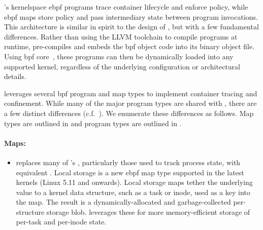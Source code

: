 \bpfcontain{}'s kernelspace \gls{ebpf} programs trace container lifecycle and enforce
policy, while \gls{ebpf} maps store policy and pass intermediary state between program
invocations. This architecture is similar in spirit to the design of \bpfbox{}, but with
a few fundamental differences. Rather than using the LLVM toolchain to compile
programs at runtime, \bpfcontain{} pre-compiles and embeds the \gls{bpf} object code into
its binary object file. Using \gls{bpf} \gls{core}~\cite{nakryiko2020_core}, these
programs can then be dynamically loaded into any supported kernel, regardless of the
underlying configuration or architectural details.

\bpfcontain{} leverages several \gls{bpf} program and map types to implement container
tracing and confinement. While many of the major program types are shared with \bpfbox{},
there are a few distinct differences (c.f.\ ). We enumerate
these differences as follows. Map types are outlined in \textbf{} and program
types are outlined in \textbf{}.

\paragraph*{Maps:}
\begin{itemize}
  \item \bpfcontain{} replaces many of \bpfbox{}'s \textbf{},
  particularly those used to track process state, with equivalent \textbf{}. Local storage is a new \gls{ebpf} map type supported in the latest
  kernels (Linux 5.11 and onwards). Local storage maps tether the underlying value to
  a kernel data structure, such as a task or inode, used as a key into the map. The result
  is a dynamically-allocated and garbage-collected per-structure storage blob.
  \bpfcontain{} leverages these for more memory-efficient storage of per-task and
  per-inode state.
\end{itemize}


